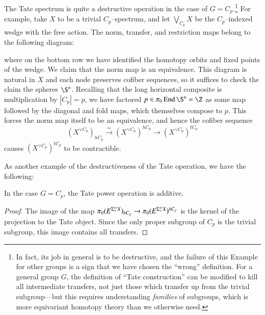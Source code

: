 \begin{example}
The Tate spectrum is quite a destructive operation in the case of $G = C_p$.\footnote{In fact, its job in general is to be destructive, and the failure of this Example for other groups is a sign that we have chosen the ``wrong'' definition. For a general group $G$, the definition of ``Tate construction'' can be modified to kill all intermediate transfers, not just those which transfer up from the trivial subgroup---but this requires understanding \textit{families} of subgroups, which is more equivariant homotopy theory than we otherwise need.}  For example, take $X$ to be a trivial $C_p$--spectrum, and let $\bigvee_{C_p} X$ be the $C_p$--indexed wedge with the free action.  The norm, transfer, and restriction maps belong to the following diagram:
\begin{center}
\end{center}
where on the bottom row we have identified the homotopy orbits and fixed points of the wedge.  We claim that the norm map is an equivalence.  This diagram is natural in $X$ and each node preserves cofiber sequences, so it suffices to check the claim the spheres $\S^n$.  Recalling that the long horizontal composite is multiplication by $|C_p| = p$, we have factored $p \in \pi_0 \End \S^n = \Z$ as some map followed by the diagonal and fold maps, which themselves compose to $p$.  This forces the norm map itself to be an equivalence, and hence the cofiber sequence \[(X^{\vee C_p})_{hC_p} \xrightarrow{\simeq} (X^{\vee C_p})^{hC_p} \to (X^{\vee C_p})^{tC_p}\] causes $(X^{\vee C_p})^{tC_p}$ to be contractible.
\end{example}

As another example of the destructiveness of the Tate operation, we have the following:

\begin{lemma}
In the case $G = C_p$, the Tate power operation is additive.
\end{lemma}
\begin{proof}
The image of the map $\pi_0 (E^{\Sigma^\infty_+ X})_{hC_p} \to \pi_0 (E^{\Sigma^\infty_+ X})^{hC_p}$ is the kernel of the projection to the Tate object.  Since the only proper subgroup of $C_p$ is the trivial subgroup, this image contains all transfers.
\end{proof}

